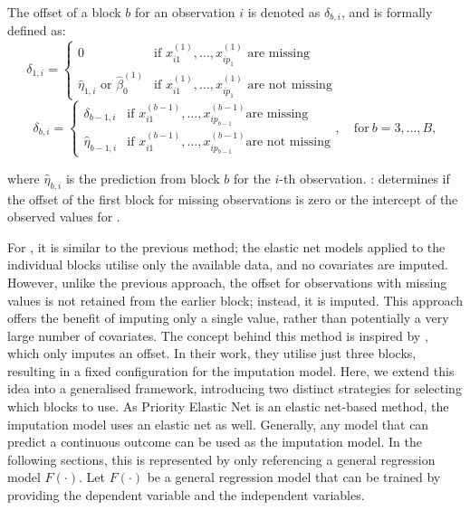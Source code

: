 The offset of a block \(b\) for an observation \(i\) is denoted as \(\delta_{b,i}\), and is formally defined as:
\[
\delta_{1,i} =
\begin{cases} 
    0 & \text{if } x^{(1)}_{i1}, \dots, x^{(1)}_{ip_1} \text{ are missing} \\
    \hat{\eta}_{1,i} \text{ or } \hat{\beta}^{(1)}_0 & \text{if } x^{(1)}_{i1}, \dots, x^{(1)}_{ip_1} \text{ are not missing}
\end{cases}  \quad \quad \quad \quad \quad \quad \quad \quad \ \
\]
\[
\delta_{b,i} =
\begin{cases} 
    \delta_{b-1,i} & \text{if } x^{(b-1)}_{i1}, \dots, x^{(b-1)}_{ip_{b-1}} \text{are missing}\\
    \hat{\eta}_{b-1,i} & \text{if } x^{(b-1)}_{i1}, \dots, x^{(b-1)}_{ip_{b-1}} \text{are not missing}
\end{cases}, \quad \text{for} \ b = 3, \dots, B,
\] 

\noindent where \(\hat{\eta}_{b,i}\) is the prediction from block \(b\) for the \(i\)-th observation.
\code{offset.firstblock}:
determines if the offset of the first block for missing observations is zero or the intercept of the observed values for .

For , it is similar to the previous method; the elastic net models applied to the individual blocks utilise only the available data, and no covariates are imputed. However, unlike the previous approach, the offset for observations with missing values is not retained from the earlier block; instead, it is imputed. This approach offers the benefit of imputing only a single value, rather than potentially a very large number of covariates. The concept behind this method is inspired by \citet{hieke2016integrating}, which only imputes an offset. In their work, they utilise just three blocks, resulting in a fixed configuration for the imputation model. Here, we extend this idea into a generalised framework, introducing two distinct strategies for selecting which blocks to use.
As Priority Elastic Net is an elastic net-based method, the imputation model uses an elastic net as well. Generally, any model that can predict a continuous outcome can be used as the imputation model. In the following sections, this is represented by only referencing a general regression model $F(\cdot)$. Let $F(\cdot)$ be a general regression model that can be trained by providing the dependent variable
and the independent variables.

